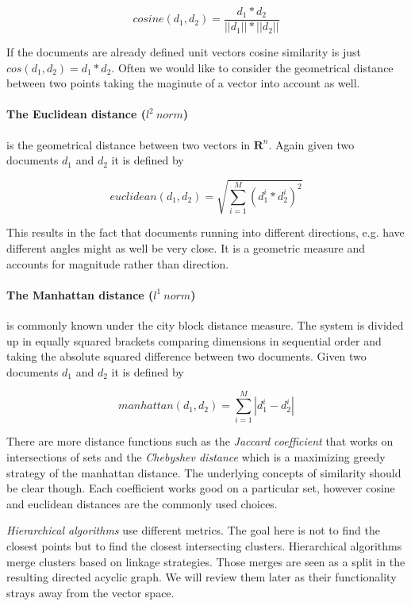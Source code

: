     \begin{equation}
      cosine(d_1, d_2) = \frac{d_1 * d_2}{||d_1|| * ||d_2||}
    \end{equation}

    If the documents are already defined unit vectors cosine similarity is just $cos(d_1, d_2) = d_1 * d_2$. Often we would like to consider the geometrical distance between two points taking the maginute of a vector into account as well.

    \paragraph{The Euclidean distance ($l^2\:norm$)} is the geometrical distance between two vectors in $\mathbf{R}^n$. Again given two documents $d_1$ and $d_2$ it is defined by

    \begin{equation}
      euclidean(d_1, d_2) = \sqrt{\sum_{i=1}^{M}(d_1^i * d_2^i)^2}
    \end{equation}

    This results in the fact that documents running into different directions, e.g. have different angles might as well be very close. It is a geometric measure and accounts for magnitude rather than direction.

    \paragraph{The Manhattan distance ($l^1\:norm$)} is commonly known under the city block distance measure. The system is divided up in equally squared brackets comparing dimensions in sequential order and taking the absolute squared difference between two documents. Given two documents $d_1$ and $d_2$ it is defined by

    \begin{equation}
      manhattan(d_1, d_2) = \sum_{i=1}^{M}|d_1^i - d_2^i|
    \end{equation}

    There are more distance functions such as the \emph{Jaccard coefficient} that works on intersections of sets and the \emph{Chebyshev distance} which is a maximizing greedy strategy of the manhattan distance. The underlying concepts of similarity should be clear though. Each coefficient works good on a particular set, however cosine and euclidean distances are the commonly used choices.

    \emph{Hierarchical algorithms} use different metrics. The goal here is not to find the closest points but to find the closest intersecting clusters. Hierarchical algorithms merge clusters based on linkage strategies. Those merges are seen as a split in the resulting directed acyclic graph. We will review them later as their functionality strays away from the vector space.

